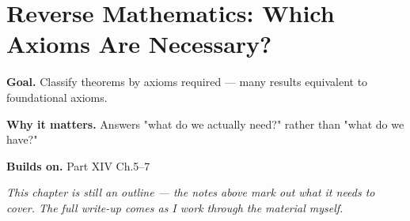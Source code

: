 \chapter{Reverse Mathematics: Which Axioms Are Necessary?}
\label{ch:14-metamathematics-09}

\begin{chapterintro}
\textbf{Goal.} Classify theorems by axioms required — many results equivalent to foundational axioms.

\textbf{Why it matters.} Answers "what do we actually need?" rather than "what do we have?"

\textbf{Builds on.} Part XIV Ch.5–7
\end{chapterintro}

\textit{This chapter is still an outline --- the notes above mark out what it needs to cover. The full write-up comes as I work through the material myself.}
